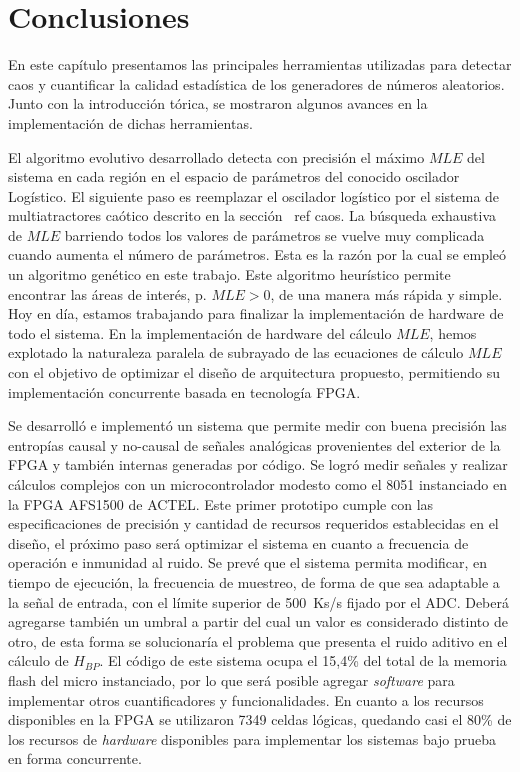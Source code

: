 \section{Conclusiones}

En este capítulo presentamos las principales herramientas utilizadas para detectar caos y cuantificar la calidad estadística de los generadores de números aleatorios.
Junto con la introducción tórica, se mostraron algunos avances en la implementación de dichas herramientas.

El algoritmo evolutivo desarrollado detecta con precisión el máximo $ MLE $ del sistema en cada región en el espacio de parámetros del conocido oscilador Logístico.
El siguiente paso es reemplazar el oscilador logístico por el sistema de multiatractores caótico descrito en la sección \ ref {caos}.
La búsqueda exhaustiva de $ MLE $ barriendo todos los valores de parámetros se vuelve muy complicada cuando aumenta el número de parámetros.
Esta es la razón por la cual se empleó un algoritmo genético en este trabajo.
Este algoritmo heurístico permite encontrar las áreas de interés, p. $ MLE> 0 $, de una manera más rápida y simple.
Hoy en día, estamos trabajando para finalizar la implementación de hardware de todo el sistema.
En la implementación de hardware del cálculo $ MLE $, hemos explotado la naturaleza paralela de subrayado de las ecuaciones de cálculo $ MLE $ con el objetivo de optimizar el diseño de arquitectura propuesto, permitiendo su implementación concurrente basada en tecnología FPGA.

Se desarrolló e implementó un sistema que permite medir con buena precisión las entropías causal y no-causal de señales analógicas provenientes del exterior de la FPGA y también internas generadas por código.
Se logró medir señales y realizar cálculos complejos con un microcontrolador modesto como el 8051 instanciado en la FPGA AFS1500 de ACTEL.
Este primer prototipo cumple con las especificaciones de precisión y cantidad de recursos requeridos establecidas en el diseño, el próximo paso será optimizar el sistema en cuanto a frecuencia de operación e inmunidad al ruido.
Se prevé que el sistema permita modificar, en tiempo de ejecución, la frecuencia de muestreo, de forma de que sea adaptable a la señal de entrada, con el límite superior de 500~Ks/s fijado por el ADC.
Deberá agregarse también un umbral a partir del cual un valor es considerado distinto de otro, de esta forma se solucionaría el problema que presenta el ruido aditivo en el cálculo de $H_{BP}$.
El código de este sistema ocupa el 15,4\% del total de la memoria flash del micro instanciado, por lo que será posible agregar \textit{software} para implementar otros cuantificadores y funcionalidades.
En cuanto a los recursos disponibles en la FPGA se utilizaron 7349 celdas lógicas, quedando casi el 80\% de los recursos de \textit{hardware} disponibles para implementar los sistemas bajo prueba en forma concurrente.

